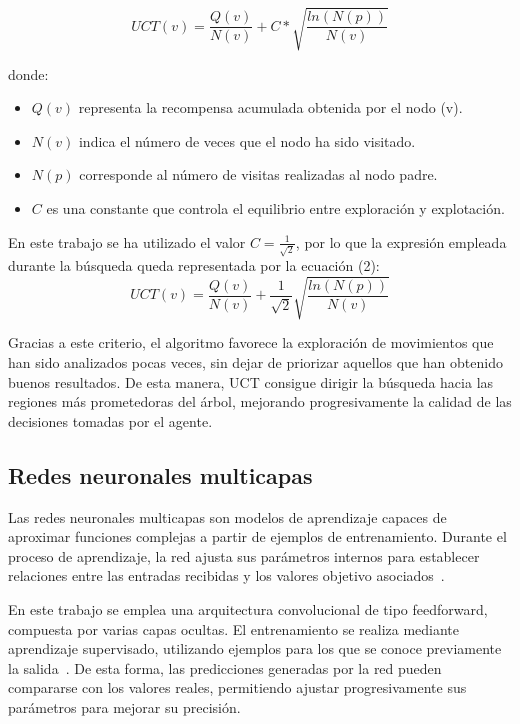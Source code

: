 \documentclass[conference,a4paper]{IEEEtran}
\begin{document}
\begin{equation}
UCT(v)=\frac{Q(v)}{N(v)}+C*\sqrt{\frac{ln(N(p))}{N(v)}} 
\end{equation}

donde: 
\begin{itemize}
\item $Q(v)$ representa la recompensa acumulada obtenida por el nodo (v). 
\item $N(v)$ indica el número de veces que el nodo ha sido visitado. 
\item $N(p)$ corresponde al número de visitas realizadas al nodo padre. 
\item $C$ es una constante que controla el equilibrio entre exploración y explotación. 
\end{itemize}

En este trabajo se ha utilizado el valor $C=\frac{1}{\sqrt{2}}$, por lo que la expresión empleada durante la búsqueda queda representada por la ecuación (2): 
\begin{equation}
UCT(v) = \frac{Q(v)}{N(v)} + \frac{1}{\sqrt{2}}\sqrt{\frac{ln(N(p))}{N(v)}} 
\end{equation}

Gracias a este criterio, el algoritmo favorece la exploración de movimientos que han sido analizados pocas veces, sin dejar de priorizar aquellos que han obtenido buenos resultados. 
De esta manera, UCT consigue dirigir la búsqueda hacia las regiones más prometedoras del árbol, mejorando progresivamente la calidad de las decisiones tomadas por el agente. 

\subsection{Redes neuronales multicapas} 
Las redes neuronales multicapas son modelos de aprendizaje capaces de aproximar funciones complejas a partir de ejemplos de entrenamiento. 
Durante el proceso de aprendizaje, la red ajusta sus parámetros internos para establecer relaciones entre las entradas recibidas y los valores objetivo asociados~\cite{b4}. 

En este trabajo se emplea una arquitectura convolucional de tipo feedforward, compuesta por varias capas ocultas. 
El entrenamiento se realiza mediante aprendizaje supervisado, utilizando ejemplos para los que se conoce previamente la salida~\cite{b3}. 
De esta forma, las predicciones generadas por la red pueden compararse con los valores reales, permitiendo ajustar progresivamente sus parámetros para mejorar su precisión. 
\end{document}
